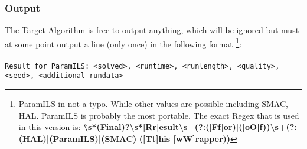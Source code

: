 \documentclass[manual.tex]{subfiles}
\begin{document}
\subsubsection{Output}\label{sec:wrapper_output}

The Target Algorithm is free to output anything, which will be ignored
but must at some point output a line (only once) in the following
format%
\footnote{ParamILS in not a typo. While other values are possible including
SMAC, HAL. ParamILS is probably the most portable. The exact Regex
that is used in this version is: \textbf{\^\textbackslash{}s{*}(Final)?\textbackslash{}s{*}{[}Rr{]}esult\textbackslash{}s+(?:([Ff]or)|([oO]f))\textbackslash{}s+(?:(HAL)|(ParamILS)|(SMAC)|([Tt]his
[wW]rapper))}}:%
\\
\\
\texttt{Result for ParamILS: <solved>, <runtime>, <runlength>, <quality>, <seed>, <additional rundata>} 
\end{document}
